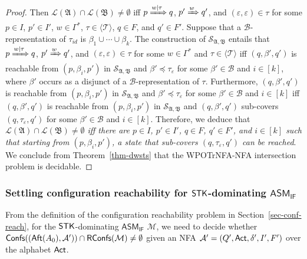 \documentclass[preprint,12pt]{elsarticle}
\newcommand\Aa{{\mathcal{A} }}
\newcommand\Mm{{\mathcal{M} }}
\newcommand\act{{\sf Act}}
\newcommand\aft{{\sf Aft}}
\newcommand\singletask{{\sf STK}}
\newcommand{\IFAMASS}{\textsf{ASM}_\textsf{IF}}
\newcommand\confs{{\mathsf{Confs} }}
\newcommand\RConfs{\mathsf{RConfs}}
\newcommand\Aut{{\mathfrak{A} }}
\newcommand\AutB{{\mathfrak{B} }}
\newcommand\Lang{{\mathscr{L} }}
\newcommand\TranSet{{\mathscr{T} }}
\newcommand\Tranbasis{{\mathscr{B} }}
\newcommand{\WOTrNFA}{\textsf{WPOTrNFA}}
\newcommand{\NFA}{\textsf{NFA}}
\newcommand{\wstsnodes}{\mathscr{S}}
\begin{document}
\begin{proof}
Then $\Lang(\Aut) \cap \Lang(\AutB) \neq \emptyset$ iff $p \xRightarrow{w | \tau} q$, $p' \xRightarrow{w} q'$, and $(\varepsilon, \varepsilon) \in \tau$ for some $p \in I$, $p'\in I'$, $w \in \Gamma^*$, $\tau \in \langle \TranSet \rangle$, $q \in F$, and $q' \in F'$. Suppose that a $\Tranbasis$-representation of $\tau_{id}$ is $\beta_1 \cup \cdots \cup \beta_k$. 
The construction of $\wstsnodes_{\Aut,\AutB}$ entails that $p \xRightarrow{w | \tau} q$, $p' \xRightarrow{w} q'$, and $(\varepsilon, \varepsilon) \in \tau$ for some $w \in \Gamma^*$  and $\tau \in \langle \TranSet \rangle$  iff $(q, \beta', q')$ is reachable from $(p, \beta_i, p')$ in $\wstsnodes_{\Aut,\AutB}$ and $\beta' \preceq \tau_\varepsilon$ for some $\beta' \in \Tranbasis$ and $i \in [k]$, where $\beta'$ occurs as a disjunct of a $\Tranbasis$-representation of $\tau$. 
%
Furthermore, $(q, \beta', q')$ is reachable from $(p, \beta_i, p')$ in $\wstsnodes_{\Aut,\AutB}$ and $\beta' \preceq \tau_\varepsilon$ for some $\beta' \in \Tranbasis$ and $i \in [k]$ iff $(q, \beta', q')$ is reachable from $(p, \beta_i, p')$ in $\wstsnodes_{\Aut,\AutB}$ and $(q, \beta', q')$ sub-covers $(q, \tau_\varepsilon, q')$ for some $\beta' \in \Tranbasis$ and $i \in [k]$. Therefore, we deduce that \emph{$\Lang(\Aut) \cap \Lang(\AutB) \neq \emptyset$ iff there are $p \in I$, $p' \in I'$, $q \in F$, $q' \in F'$, and $i \in [k]$ such that starting from $(p, \beta_i, p')$, a state that sub-covers $(q, \tau_\varepsilon, q')$ can be reached}.
We conclude from Theorem~\ref{thm-dwsts} that the {\WOTrNFA}-{\NFA} intersection problem is decidable.
\end{proof}


\subsubsection{Settling configuration reachability for $\singletask$-dominating $\IFAMASS$}\label{sec-ifamass-reach}

From the definition of the configuration reachability problem in Section~\ref{sec-conf-reach}, for the $\singletask$-dominating $\IFAMASS$ $\Mm$, we need to decide whether $\confs((\aft(A_0), \Aa')) \cap \RConfs(\Mm) \neq \emptyset$ given an {\NFA} $\Aa' = (Q', \act, \delta', I', F')$ over the alphabet $\act$. 
\end{document}
